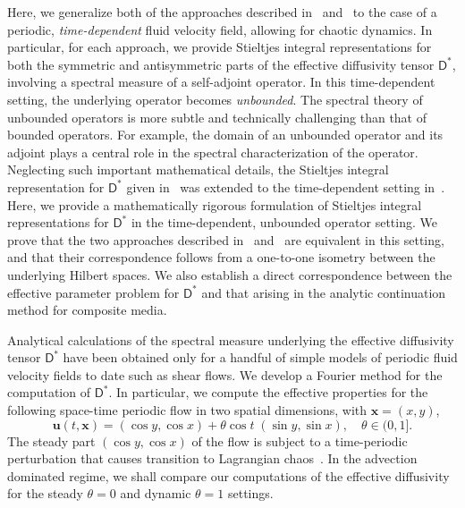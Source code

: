 \documentclass[leqno,onefignum,onetabnum]{siamltex1213}
\newcommand{\Dm}{\mathsf{D}}
\newcommand{\vecx}{\boldsymbol{x}}
\newcommand{\vecu}{\boldsymbol{u}}
\begin{document}
Here, we generalize both of the approaches described
in~\cite{Avellaneda:PRL-753,Avellaneda:CMP-339}
and~\cite{Pavliotis:PHD_Thesis} to the case of a periodic,
\emph{time-dependent} fluid velocity field, allowing for chaotic
dynamics. In particular, for each approach, we provide Stieltjes
integral representations for both the symmetric and antisymmetric
parts of the effective diffusivity tensor $\Dm^*$, involving a
spectral measure of a self-adjoint operator. In this time-dependent
setting, the underlying operator becomes \emph{unbounded}. The
spectral theory of unbounded operators is more subtle and technically
challenging than that of bounded operators. For example, the domain of
an unbounded operator and its adjoint plays a central role in the
spectral characterization of the operator. Neglecting such important
mathematical details, the Stieltjes integral representation for
$\Dm^*$ given in~\cite{Avellaneda:PRL-753,Avellaneda:CMP-339} was
extended to the time-dependent setting
in~\cite{Avellaneda:PRE:3249}. Here, we provide a mathematically
rigorous formulation of Stieltjes integral representations for $\Dm^*$
in the time-dependent, unbounded operator setting. We prove that the
two approaches described
in~\cite{Avellaneda:PRL-753,Avellaneda:CMP-339}
and~\cite{Pavliotis:PHD_Thesis} are equivalent in this setting, and
that their correspondence follows from a one-to-one isometry between
the underlying Hilbert spaces. We also establish a direct
correspondence between the effective parameter problem for $\Dm^*$ and
that arising in the analytic continuation method for composite
media.






Analytical calculations of the spectral measure underlying the
effective diffusivity tensor $\Dm^*$ have been obtained
only for a handful of simple models of periodic fluid velocity
fields to date such as shear flows. We develop a 
Fourier method for the computation of $\Dm^*$. In particular, we 
compute the effective properties for the following space-time periodic
flow in two spatial dimensions, with $\vecx=(x,y)$,
%
\begin{equation}\label{eq:tdcell}
\vecu (t,\vecx)=(\cos{y},\cos{x}) + \theta\cos{t}\;(\sin{y},\sin{x}),
\quad
\theta \in (0,1].
\end{equation}
%
The steady part $(\cos{y}, \cos{x})$ of the flow is subject to a
time-periodic perturbation that causes transition to Lagrangian
chaos~\cite{Biferale:PF:2725,ZCX_2015}. In the advection dominated
regime, we shall compare our computations of the effective diffusivity
for the steady $\theta=0$ and dynamic $\theta=1$ settings.  
          
\end{document}
